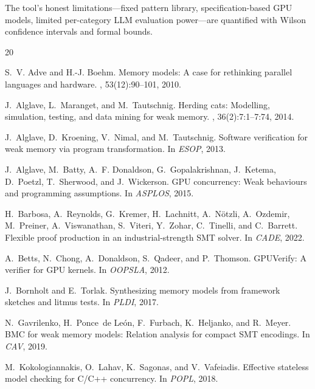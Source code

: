 \documentclass[11pt]{article}
\begin{document}
The tool's honest limitations---fixed pattern library,
specification-based GPU models, limited per-category LLM
evaluation power---are quantified with Wilson confidence
intervals and formal bounds.


\begin{thebibliography}{20}

S.~V. Adve and H.-J. Boehm.
\newblock Memory models: A case for rethinking parallel languages and hardware.
, 53(12):90--101, 2010.

J.~Alglave, L.~Maranget, and M.~Tautschnig.
\newblock Herding cats: Modelling, simulation, testing, and data mining for
  weak memory.
, 36(2):7:1--7:74, 2014.

J.~Alglave, D.~Kroening, V.~Nimal, and M.~Tautschnig.
\newblock Software verification for weak memory via program transformation.
\newblock In {\em ESOP}, 2013.

J.~Alglave, M.~Batty, A.~F. Donaldson, G.~Gopalakrishnan, J.~Ketema,
  D.~Poetzl, T.~Sherwood, and J.~Wickerson.
\newblock GPU concurrency: Weak behaviours and programming assumptions.
\newblock In {\em ASPLOS}, 2015.

H.~Barbosa, A.~Reynolds, G.~Kremer, H.~Lachnitt, A.~N\"otzli,
  A.~Ozdemir, M.~Preiner, A.~Viswanathan, S.~Viteri, Y.~Zohar,
  C.~Tinelli, and C.~Barrett.
\newblock Flexible proof production in an industrial-strength SMT solver.
\newblock In {\em CADE}, 2022.

A.~Betts, N.~Chong, A.~Donaldson, S.~Qadeer, and P.~Thomson.
\newblock GPUVerify: A verifier for GPU kernels.
\newblock In {\em OOPSLA}, 2012.

J.~Bornholt and E.~Torlak.
\newblock Synthesizing memory models from framework sketches and litmus tests.
\newblock In {\em PLDI}, 2017.

N.~Gavrilenko, H.~Ponce~de Le\'{o}n, F.~Furbach, K.~Heljanko, and
  R.~Meyer.
\newblock BMC for weak memory models: Relation analysis for compact SMT
  encodings.
\newblock In {\em CAV}, 2019.

M.~Kokologiannakis, O.~Lahav, K.~Sagonas, and V.~Vafeiadis.
\newblock Effective stateless model checking for C/C++ concurrency.
\newblock In {\em POPL}, 2018.


\end{thebibliography}
\end{document}
